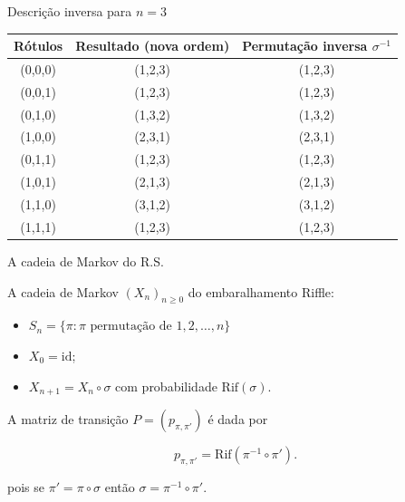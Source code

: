 \documentclass{beamer}
\begin{document}
\begin{frame}{ Descrição inversa para \(n=3\)}

  \begin{center}
    \begin{tabular}{c|c|c}
      \textbf{Rótulos} & \textbf{Resultado (nova ordem)} & \textbf{Permutação inversa $\sigma^{-1}$}\\
      \hline
      (0,0,0) & (1,2,3) & (1,2,3) \\[.3em]
      (0,0,1) & (1,2,3) & (1,2,3) \\[.3em]
      (0,1,0) & (1,3,2) & (1,3,2) \\[.3em]
      (1,0,0) & (2,3,1) & (2,3,1) \\[.3em]
      (0,1,1) & (1,2,3) & (1,2,3) \\[.3em]
      (1,0,1) & (2,1,3) & (2,1,3) \\[.3em]
      (1,1,0) & (3,1,2) & (3,1,2) \\[.3em]
      (1,1,1) & (1,2,3) & (1,2,3)
    \end{tabular}
  \end{center}

\end{frame}
\begin{frame}{A cadeia de Markov do R.S.}

  A cadeia de Markov $(X_n)_{n\ge0}$ do embaralhamento Riffle:

  \begin{itemize}\itemsep=.3cm
  \item $S_n= \{ \pi\colon \pi \text{ permutação de  }  1,2,\dots,n\}$
  \item $X_0 = \mathrm{id}$;
  \item $X_{n+1} = X_n\circ \sigma$ com probabilidade $\mathrm{Rif}(\sigma)$.
  \end{itemize}

  \vfill


  A matriz de transição $P = (p_{\pi,\pi'})$ é dada por

  \[
    p_{\pi,\pi'} =  \mathrm{Rif}(\pi^{-1}\circ\pi') .
  \]
  
  pois se $\pi' = \pi\circ\sigma$ então $\sigma = \pi^{-1}\circ\pi'$.
  
  
\end{frame}
\end{document}
